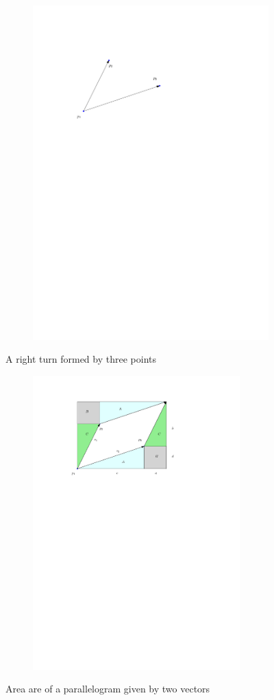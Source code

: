\begin{figure}[H]
    \centering
	\begin{subfigure}{.7\textwidth}
		\includegraphics[width=.5\textwidth]{figures/rightturn1.pdf}
		\caption{}
		\label{fig:rightturn_a}
	\end{subfigure}
	\caption{A right turn formed by three points}
	\begin{subfigure}{.7\textwidth}
		\includegraphics[width=8cm]{figures/rightturn2.pdf}
		\caption{}
		\label{fig:rightturn_b}
	\end{subfigure}
	\caption{Area are of a parallelogram given by two vectors}
\end{figure}

